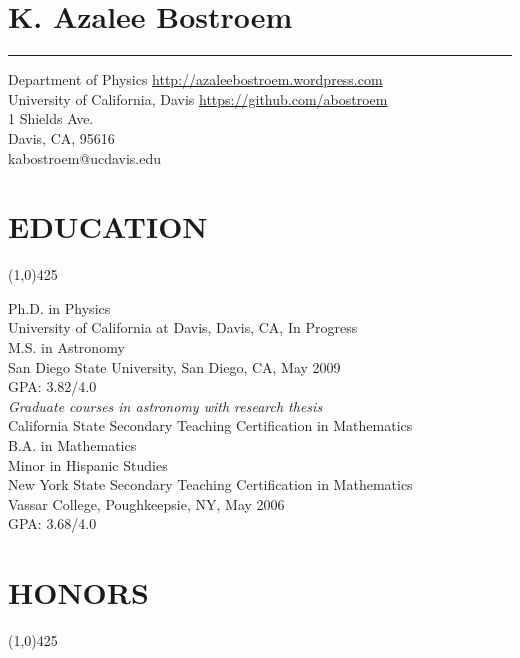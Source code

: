 \documentclass{res}
\begin{document}
 

\section{{\LARGE \bf{K. Azalee Bostroem}}}
{\rule{\linewidth}{0.5mm}}
Department of Physics \hfill {\color{blue}\url{http://azaleebostroem.wordpress.com}}\\
University of California, Davis \hfill {\color{blue}\url{https://github.com/abostroem} }\\
1 Shields Ave. \\
Davis, CA, 95616 \\
kabostroem@ucdavis.edu

\begin{resume}

\section{EDUCATION}
\vspace{-.2in} 
\begin{center}
\line(1,0){425}
\end{center}
\vspace{-.3in} 
\vspace{0.1in} 
 
   Ph.D. in Physics \\
   University of California at Davis, Davis, CA, In Progress \\
 
    M.S. in Astronomy \\
    San Diego State University, San Diego, CA, May 2009 \\
    GPA: 3.82/4.0 \\
    \emph{Graduate courses in astronomy with research thesis} \\
    
    California State Secondary Teaching Certification in Mathematics \\
 
    B.A. in Mathematics \\
    Minor in Hispanic Studies \\
    New York State Secondary Teaching Certification in Mathematics \\
    Vassar College, Poughkeepsie, NY, May 2006\\
    GPA: 3.68/4.0   
 
\section{HONORS}
\vspace{-.2in} 
\begin{center}
\line(1,0){425}
\end{center}
\vspace{-.3in} 
\vspace{0.1in} 


\end{resume}
\end{document}

